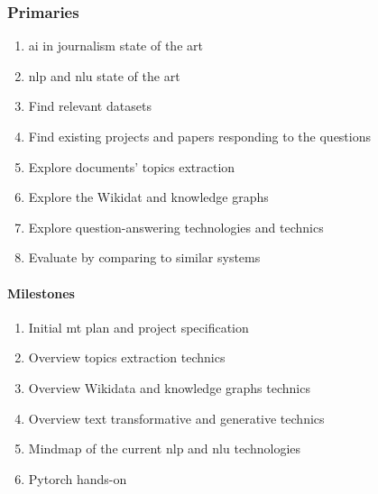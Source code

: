 \subsubsection{Primaries}
\begin{enumerate}
    \setlength\itemsep{0em}
    \item \gls{ai} in journalism state of the art
    \item \gls{nlp} and \gls{nlu} state of the art
    \item Find relevant datasets
    \item Find existing projects and papers responding to the questions
    \item Explore documents' topics extraction
    \item Explore the Wikidat and knowledge graphs
    \item Explore question-answering technologies and technics
    \item Evaluate by comparing to similar systems
\end{enumerate}
\paragraph{Milestones}
\begin{enumerate}
    \setlength\itemsep{0em}
    \item Initial \gls{mt} plan and project specification
    \item Overview topics extraction technics
    \item Overview Wikidata and knowledge graphs technics
    \item Overview text transformative and generative technics
    \item Mindmap of the current \gls{nlp} and \gls{nlu} technologies
    \item Pytorch hands-on
\end{enumerate}

